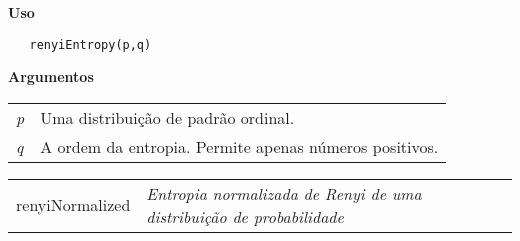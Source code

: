 \vspace{-0.5cm}

\hrulefill  

\vspace{0.5cm}

\textbf{Uso}

\begin{lstlisting}
   renyiEntropy(p,q)
\end{lstlisting}

\vspace{0.5cm}

\textbf{Argumentos}

\begin{table}[!ht]
\begin{center}
\begin{tabularx}{\textwidth}{X X}
\hspace{0.5cm} \textit{p} \vspace{0.5cm}& Uma distribuição de padrão ordinal.\vspace{0.5cm}\\
\hspace{0.5cm} \textit{q} \vspace{0.5cm}& A ordem da entropia. Permite apenas números positivos.\vspace{0.5cm}\\
\end{tabularx}
\end{center}
\end{table} 
\newpage


\hrulefill   

\begin{table}[!ht]
\begin{center}
\begin{tabularx}{\textwidth}{ X X}
\hspace{0.5cm} renyiNormalized & \textit{Entropia normalizada de Renyi de uma distribuição de probabilidade}\\
\end{tabularx}
\end{center}
\end{table} 

\vspace{-0.5cm}

\hrulefill  

\vspace{0.5cm}


